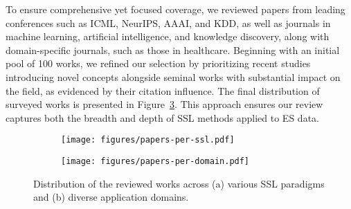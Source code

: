 \documentclass[twoside,11pt]{article}
\begin{document}
To ensure comprehensive yet focused coverage, we reviewed papers from leading conferences such as ICML, NeurIPS, AAAI, and KDD, as well as journals in machine learning, artificial intelligence, and knowledge discovery, along with domain-specific journals, such as those in healthcare. Beginning with an initial pool of 100 works, we refined our selection by prioritizing recent studies introducing novel concepts alongside seminal works with substantial impact on the field, as evidenced by their citation influence. The final distribution of surveyed works is presented in Figure~\ref{fig:literature-statistics}. This approach ensures our review captures both the breadth and depth of SSL methods applied to ES data.

\begin{figure}[ht!]
    \centering
    \begin{subfigure}[b]{0.48\textwidth}
        \centering
        \texttt{[image: figures/papers-per-ssl.pdf]}
        \caption{}
        \label{fig:literature-ssl-stats}
    \end{subfigure}
    \begin{subfigure}[b]{0.48\textwidth}
        \centering
        \texttt{[image: figures/papers-per-domain.pdf]}
        \caption{}
        \label{fig:literature-domain-stats}
    \end{subfigure}

    \caption{Distribution of the reviewed works across (a) various SSL paradigms and (b) diverse application domains.}
    \label{fig:literature-statistics}
\end{figure}

\begin{figure}[ht!]
\end{figure}
\end{document}
